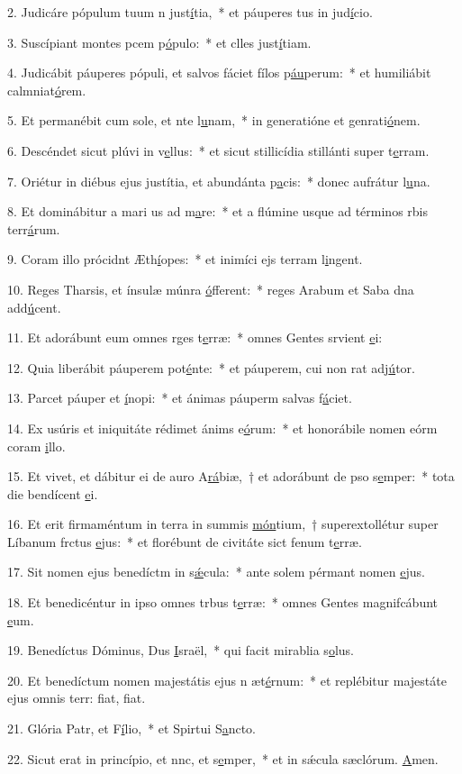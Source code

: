 2. Judicáre pópulum tuum n just\uline{í}tia,~* et páuperes tus in jud\uline{í}cio.\par 
3. Suscípiant montes pcem p\uline{ó}pulo:~* et clles just\uline{í}tiam.\par 
4. Judicábit páuperes pópuli, et salvos fáciet fílos p\uline{áu}perum:~* et humiliábit calmniat\uline{ó}rem.\par 
5. Et permanébit cum sole, et nte l\uline{u}nam,~* in generatióne et genrati\uline{ó}nem.\par 
6. Descéndet sicut plúvi in v\uline{e}llus:~* et sicut stillicídia stillánti super t\uline{e}rram.\par 
7. Oriétur in diébus ejus justítia, et abundánta p\uline{a}cis:~* donec aufrátur l\uline{u}na.\par 
8. Et dominábitur a mari us ad m\uline{a}re:~* et a flúmine usque ad términos rbis terr\uline{á}rum.\par 
9. Coram illo prócidnt Æth\uline{í}opes:~* et inimíci ejs terram l\uline{i}ngent.\par 
10. Reges Tharsis, et ínsulæ múnra \uline{ó}fferent:~* reges Arabum et Saba dna add\uline{ú}cent.\par 
11. Et adorábunt eum omnes rges t\uline{e}rræ:~* omnes Gentes srvient \uline{e}i:\par 
12. Quia liberábit páuperem  pot\uline{é}nte:~* et páuperem, cui non rat adj\uline{ú}tor.\par 
13. Parcet páuper et \uline{í}nopi:~* et ánimas páuperm salvas f\uline{á}ciet.\par 
14. Ex usúris et iniquitáte rédimet ánims e\uline{ó}rum:~* et honorábile nomen eórm coram \uline{i}llo.\par 
15. Et vivet, et dábitur ei de auro A\uline{rá}biæ,~† et adorábunt de pso s\uline{e}mper:~* tota die bendícent \uline{e}i.\par 
16. Et erit firmaméntum in terra in summis \uline{món}tium,~† superextollétur super Líbanum frctus \uline{e}jus:~* et florébunt de civitáte sict fenum t\uline{e}rræ.\par 
17. Sit nomen ejus benedíctm in s\uline{ǽ}cula:~* ante solem pérmant nomen \uline{e}jus.\par 
18. Et benedicéntur in ipso omnes trbus t\uline{e}rræ:~* omnes Gentes magnifcábunt \uline{e}um.\par 
19. Benedíctus Dóminus, Dus \uline{I}sraël,~* qui facit mirablia s\uline{o}lus.\par 
20. Et benedíctum nomen majestátis ejus n æt\uline{é}rnum:~* et replébitur majestáte ejus omnis terr: fiat, f\uline{i}at.\par 
21. Glória Patr, et F\uline{í}lio,~* et Spirtui S\uline{a}ncto.\par 
22. Sicut erat in princípio, et nnc, et s\uline{e}mper,~* et in sǽcula sæclórum. \uline{A}men.\par 
